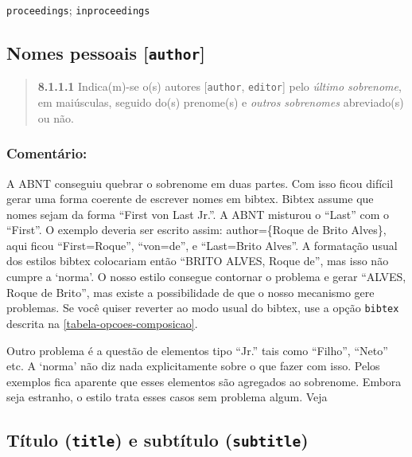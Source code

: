 \documentclass[a4paper]{ltxdoc}
\begin{document}
\texttt{proceedings}\cite{redes1995,chemical1984,quimica1997,cientifica1996,biblioteconomia1979};
\texttt{inproceedings}\cite{martin1997,brayner1994,souza1994,oliveira1996,guncho1998,sabroza1998,krzyzanowski1996}

\subsection{Nomes pessoais [\texttt{author}]}

\label{nome-pessoais}
\begin{quote}
\textbf{8.1.1.1}\cite{NBR6023:2000}
Indica(m)-se o(s) autores [\texttt{author}, \texttt{editor}]
pelo \emph{último sobrenome}, em maiúsculas, seguido
do(s) prenome(s) e \emph{outros sobrenomes} abreviado(s) ou não.
\cite{alves1995,dami1995}
\cite{alves1995,dami1995,passos1995}
\end{quote}

\subsubsection{Comentário:}
A ABNT conseguiu quebrar o sobrenome em duas partes. Com isso ficou difícil
gerar uma forma coerente de escrever nomes em \textsf{bibtex}.
\textsf{Bibtex} assume que nomes sejam da forma ``First von Last Jr.''. A ABNT
misturou o ``Last'' com o ``First''. O exemplo  deveria
ser escrito assim: author=\{Roque de Brito Alves\}, aqui ficou ``First=Roque'',
``von=de'',  e ``Last=Brito Alves''. A formatação usual dos estilos
\textsf{bibtex} colocariam então ``BRITO ALVES, Roque de'',  mas isso não cumpre
a `norma'. O nosso estilo consegue contornar o problema e gerar ``ALVES, Roque de
Brito'', mas existe a possibilidade de que o nosso mecanismo gere problemas.
Se você quiser reverter ao modo usual do \textsf{bibtex}, use a opção
\texttt{bibtex} descrita na \autoref{tabela-opcoes-composicao}. 

Outro problema é a questão de elementos tipo ``Jr.'' tais como ``Filho'',
``Neto'' etc. A `norma' não diz nada explicitamente sobre o que fazer com isso.
Pelos exemplos fica aparente que esses elementos são agregados ao sobrenome.
Embora seja estranho, o estilo trata esses casos sem problema algum.
Veja 

\subsection{Título (\texttt{title}) e subtítulo (\texttt{subtitle})}
\end{document}
